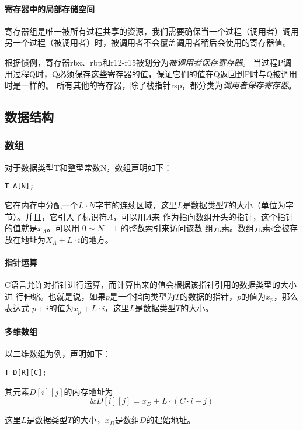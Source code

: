 \paragraph{寄存器中的局部存储空间}

寄存器组是唯一被所有过程共享的资源，我们需要确保当一个过程（调用者）调用另一个过程（被调用者）时，被调用者不会覆盖调用者稍后会使用的寄存器值。

根据惯例，寄存器rbx、rbp和r12-r15被划分为\emph{被调用者保存寄存器}。
当过程P调用过程Q时，Q必须保存这些寄存器的值，保证它们的值在Q返回到P时与Q被调用时是一样的。
所有其他的寄存器，除了栈指针rsp，都分类为\emph{调用者保存寄存器}。

\subsection{数据结构}
\subsubsection{数组}
对于数据类型T和整型常数N，数组声明如下：
\begin{lstlisting}[style=CStyle]
    T A[N];
\end{lstlisting}

它在内存中分配一个$L\cdot N$字节的连续区域，这里$L$是数据类型$T$的大小（单位为字节）。并且，它引入了标识符$A$，可以用$A$来
作为指向数组开头的指针，这个指针的值就是$x_A$。可以用 $0 \sim N-1$ 的整数索引来访问该数
组元素。数组元素$i$会被存放在地址为$X_A+L \cdot i$的地方。

\paragraph{指针运算}

C语言允许对指针进行运算，而计算出来的值会根据该指针引用的数据类型的大小进
行伸缩。也就是说，如果$p$是一个指向类型为$T$的数据的指针，$p$的值为$x_p$，那么表达式
$p+i$的值为$x_p+L\cdot i$，这里$L$是数据类型$T$的大小。

\paragraph{多维数组}
以二维数组为例，声明如下：
\begin{lstlisting}[style=CStyle]
    T D[R][C];
\end{lstlisting}

其元素$D[i][j]$的内存地址为
$$\&D[i][j] = x_D + L \cdot (C \cdot i + j)$$

这里$L$是数据类型$T$的大小，$x_D$是数组$D$的起始地址。

